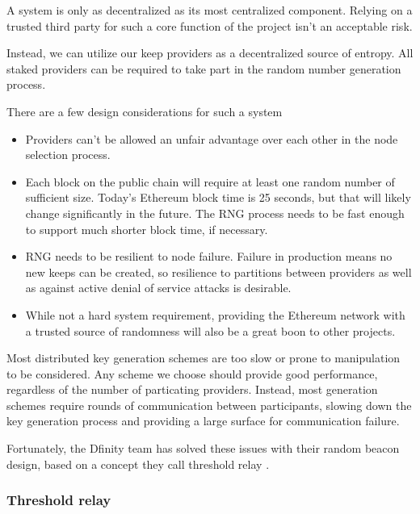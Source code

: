\documentclass[11pt]{article}
\begin{document}
A system is only as decentralized as its most centralized component.
Relying on a trusted third party for such a core function of the
project isn't an acceptable risk.

Instead, we can utilize our keep providers as a decentralized source
of entropy. All staked providers can be required to take part in the
random number generation process.

There are a few design considerations for such a system
\begin{itemize}
  \item Providers can't be allowed an unfair advantage over each other
      in the node selection process.
  \item Each block on the public chain will require at least one
      random number of sufficient size. Today's Ethereum block time is
      25 seconds, but that will likely change significantly in the
      future. The RNG process needs to be fast enough to support much
      shorter block time, if necessary.
  \item RNG needs to be resilient to node failure. Failure in
      production means no new keeps can be created, so resilience
      to partitions between providers as well as against active denial
      of service attacks is desirable.
  \item While not a hard system requirement, providing the Ethereum
      network with a trusted source of randomness will also be a great
      boon to other projects.
\end{itemize}

Most distributed key generation schemes are too slow or prone to
manipulation to be considered. Any scheme we choose should provide
good performance, regardless of the number of particating providers.
Instead, most generation schemes require rounds of communication
between participants, slowing down the key generation process and
providing a large surface for communication failure.

Fortunately, the Dfinity team has solved these issues with their
random beacon design, based on a concept they call threshold relay
\cite{thresholdRelay}.

\subsubsection{Threshold relay}
\end{document}
